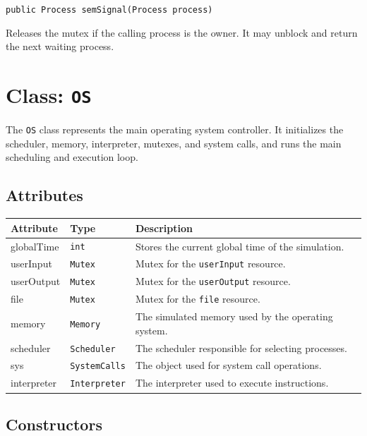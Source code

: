 \documentclass[12pt,a4paper]{article}
\begin{document}
\begin{signaturebox}
\texttt{public Process semSignal(Process process)}
\end{signaturebox}
Releases the mutex if the calling process is the owner. It may unblock and return the next waiting process.

\section{Class: \texttt{OS}}

\begin{purposebox}
The \texttt{OS} class represents the main operating system controller. It initializes the scheduler, memory, interpreter, mutexes, and system calls, and runs the main scheduling and execution loop.
\end{purposebox}

\subsection{Attributes}

\begin{tabularx}{\textwidth}{p{4cm} p{3cm} Y}
\toprule
\textbf{Attribute} & \textbf{Type} & \textbf{Description} \\
\midrule
globalTime & \texttt{int} & Stores the current global time of the simulation. \\
userInput & \texttt{Mutex} & Mutex for the \texttt{userInput} resource. \\
userOutput & \texttt{Mutex} & Mutex for the \texttt{userOutput} resource. \\
file & \texttt{Mutex} & Mutex for the \texttt{file} resource. \\
memory & \texttt{Memory} & The simulated memory used by the operating system. \\
scheduler & \texttt{Scheduler} & The scheduler responsible for selecting processes. \\
sys & \texttt{SystemCalls} & The object used for system call operations. \\
interpreter & \texttt{Interpreter} & The interpreter used to execute instructions. \\
\bottomrule
\end{tabularx}

\subsection{Constructors}
\end{document}
